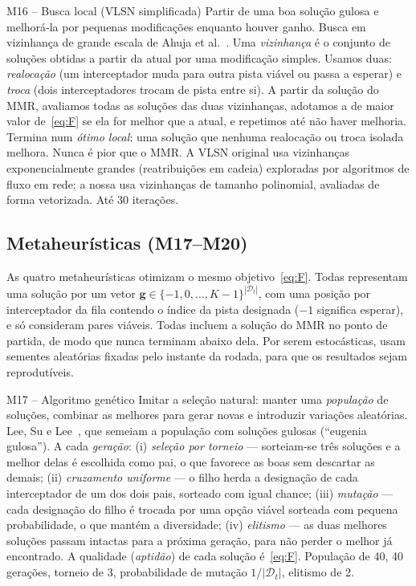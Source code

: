 \begin{metodo}{M16 -- Busca local (VLSN simplificada)}
\ideia Partir de uma boa solução gulosa e melhorá-la por pequenas modificações enquanto houver ganho.
\orig Busca em vizinhança de grande escala de Ahuja et al.~\cite{ahuja2007}.
\func Uma \emph{vizinhança} é o conjunto de soluções obtidas a partir da atual por uma modificação simples. Usamos duas:
\emph{realocação} (um interceptador muda para outra pista viável ou passa a esperar) e \emph{troca} (dois interceptadores
trocam de pista entre si). A partir da solução do MMR, avaliamos todas as soluções das duas vizinhanças, adotamos a de
maior valor de~\eqref{eq:F} se ela for melhor que a atual, e repetimos até não haver melhoria.
\prop Termina num \emph{ótimo local}: uma solução que nenhuma realocação ou troca isolada melhora. Nunca é pior que o MMR.
\adap A VLSN original usa vizinhanças exponencialmente grandes (reatribuições em cadeia) exploradas por algoritmos de fluxo
em rede; a nossa usa vizinhanças de tamanho polinomial, avaliadas de forma vetorizada.
\parm Até 30 iterações.
\end{metodo}

\subsection{Metaheurísticas (M17--M20)}
As quatro metaheurísticas otimizam o mesmo objetivo~\eqref{eq:F}. Todas representam uma solução por um vetor
$\bm{g}\in\{-1,0,\dots,K-1\}^{|\mathcal{D}_t|}$, com uma posição por interceptador da fila contendo o índice da pista
designada ($-1$ significa esperar), e só consideram pares viáveis. Todas incluem a solução do MMR no ponto de partida, de
modo que nunca terminam abaixo dela. Por serem estocásticas, usam sementes aleatórias fixadas pelo instante da rodada,
para que os resultados sejam reprodutíveis.

\begin{metodo}{M17 -- Algoritmo genético}
\ideia Imitar a seleção natural: manter uma \emph{população} de soluções, combinar as melhores para gerar novas e
introduzir variações aleatórias.
\orig Lee, Su e Lee~\cite{lee2003ga}, que semeiam a população com soluções gulosas (``eugenia gulosa'').
\func A cada \emph{geração}: (i) \emph{seleção por torneio} --- sorteiam-se três soluções e a melhor delas é escolhida
como pai, o que favorece as boas sem descartar as demais; (ii) \emph{cruzamento uniforme} --- o filho herda a designação de
cada interceptador de um dos dois pais, sorteado com igual chance; (iii) \emph{mutação} --- cada designação do filho é
trocada por uma opção viável sorteada com pequena probabilidade, o que mantém a diversidade; (iv) \emph{elitismo} --- as
duas melhores soluções passam intactas para a próxima geração, para não perder o melhor já encontrado. A qualidade
(\emph{aptidão}) de cada solução é~\eqref{eq:F}.
\parm População de 40, 40 gerações, torneio de 3, probabilidade de mutação $1/|\mathcal{D}_t|$, elitismo de 2.
\end{metodo}

